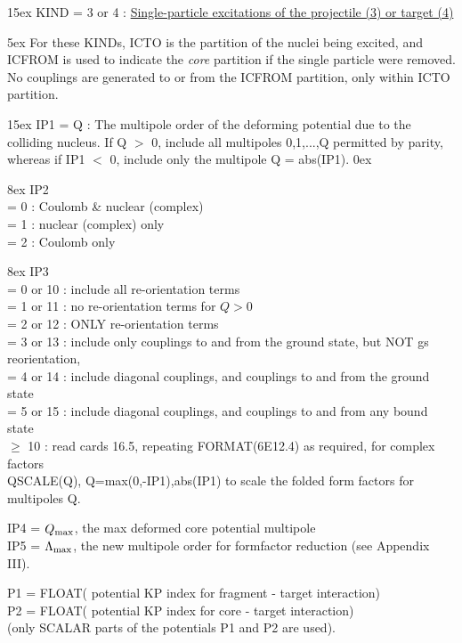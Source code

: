 \documentclass[11pt]{article}
\begin{document}
\hangindent 15ex
KIND = 3 or 4 :
\underline{Single-particle excitations of the projectile (3) or target (4)}


\hangindent 5ex
 For these KINDs, ICTO is the partition of the nuclei being excited,
and ICFROM is used to indicate the
{\em core} partition if the single particle were removed.  No couplings are
generated to or from the ICFROM partition, only within ICTO partition.

\hangindent 15ex
 IP1 = Q : The multipole order of the deforming potential due to
the colliding nucleus. If Q $>$ 0, include all multipoles 0,1,...,Q
permitted by parity, whereas if IP1 $<$ 0, include only the multipole
Q = abs(IP1).
%
\hangindent 0ex

\hangindent 8ex
IP2
\\   = 0 : Coulomb \& nuclear (complex)
\\  = 1 : nuclear (complex) only
\\  = 2 : Coulomb only



\hangindent 8ex  IP3
\\  = 0 or 10 : include all re-orientation terms
\\  = 1 or 11 : no re-orientation terms for $Q > 0$
\\  = 2 or 12 : ONLY re-orientation terms
\\  = 3 or 13 : include only couplings to and from the ground state,
    but NOT gs reorientation,
\\  = 4 or 14 : include diagonal couplings,
                and  couplings to and from the ground state
\\  = 5 or 15 : include diagonal couplings,
                and  couplings to and from any bound state
\\  $\geq$ 10      : read cards 16.5,
repeating FORMAT(6E12.4) as required, for
complex factors \\QSCALE(Q), Q=max(0,-IP1),abs(IP1)
to scale the folded form factors for multipoles Q.

IP4 = $Q_{\rm max}$, the max deformed core potential multipole\\
IP5 = $\Lambda_{\rm max}$, the new multipole order for formfactor reduction
(see Appendix III).

 P1  = FLOAT( potential KP index for fragment - target interaction) \\
 P2  = FLOAT( potential KP index for core     - target interaction) \\
        (only SCALAR parts of the potentials P1 and P2 are used).
\bigskip
\end{document}

